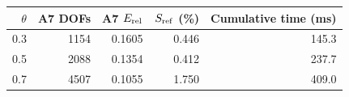 \begin{tabular}{@{}rrrrr@{}}
\toprule
$\theta$ & A7 DOFs & A7 $E_{\rm rel}$ & $S_{\rm ref}$ (\%) & Cumulative time (ms)\\
\midrule
0.3 & 1154 & 0.1605 & 0.446 & 145.3\\
0.5 & 2088 & 0.1354 & 0.412 & 237.7\\
0.7 & 4507 & 0.1055 & 1.750 & 409.0\\
\bottomrule
\end{tabular}
